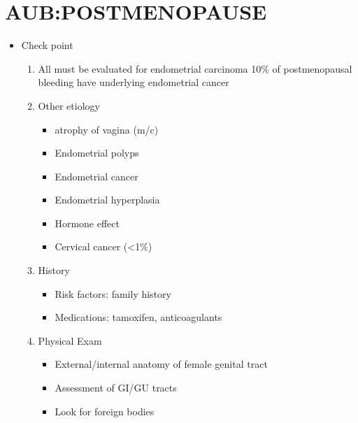 \section{AUB:POSTMENOPAUSE}
%
{
\begin{itemize}\tightlist
\item Check point 
	\begin{enumerate}\tightlist
	\item  All must be evaluated for  endometrial carcinoma 
	10\% of postmenopausal bleeding have underlying endometrial cancer  
	\item  Other etiology 
		\begin{itemize}\tightlist
		\item atrophy of vagina (m/c) 
		\item Endometrial polyps 
		\item Endometrial cancer 
		\item Endometrial hyperplasia 
		\item Hormone effect 
		\item Cervical cancer (<1\%) 
		\end{itemize}
	\item   History 
		\begin{itemize}\tightlist
		\item Risk factors: family history 
		\item Medications: tamoxifen, anticoagulants 
		\end{itemize}
	\item  Physical Exam 
		\begin{itemize}\tightlist
		\item External/internal anatomy of female genital tract 
		\item Assessment of GI/GU tracts
		\item Look for foreign bodies 
		\end{itemize}
	\end{enumerate}
\end{itemize}
}